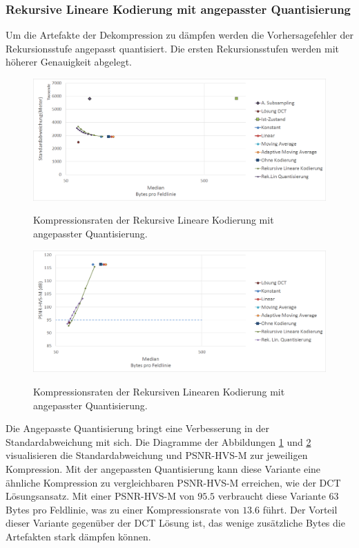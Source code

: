 \subsubsection{Rekursive Lineare Kodierung mit angepasster Quantisierung}
Um die Artefakte der Dekompression zu dämpfen werden die Vorhersagefehler der Rekursionsstufe angepasst quantisiert. Die ersten Rekursionsstufen werden mit höherer Genauigkeit abgelegt.

\begin{figure}[!htbp]
	\center
	\includegraphics[width=1\textwidth,keepaspectratio]{./pictures/resultate/loesung2/variante3/resultate.png}
		\label{resultate:loesung2:adaptive:median:quant}
		\caption{Kompressionsraten der Rekursive Lineare Kodierung mit angepasster Quantisierung.}
\end{figure}
\begin{figure}[!htbp]
	\includegraphics[width=1\textwidth,keepaspectratio]{./pictures/resultate/loesung2/variante3/resultate_psnr.png}
	\label{resultate:loesung2:adaptive:median:quant_psnr}
	\caption{Kompressionsraten der Rekursiven Linearen Kodierung mit angepasster Quantisierung.}
\end{figure}
Die Angepasste Quantisierung bringt eine Verbesserung in der Standardabweichung mit sich. Die Diagramme der Abbildungen \ref{resultate:loesung2:adaptive:median:quant} und \ref{resultate:loesung2:adaptive:median:quant_psnr} visualisieren die Standardabweichung und PSNR-HVS-M zur jeweiligen Kompression. Mit der angepassten Quantisierung kann diese Variante eine ähnliche Kompression zu vergleichbaren PSNR-HVS-M erreichen, wie der DCT Lösungsansatz. Mit einer PSNR-HVS-M von $95.5$ verbraucht diese Variante $63$ Bytes pro Feldlinie, was zu einer Kompressionsrate von $13.6$ führt. Der Vorteil dieser Variante gegenüber der DCT Lösung ist, das wenige zusätzliche Bytes die Artefakten stark dämpfen können. 

